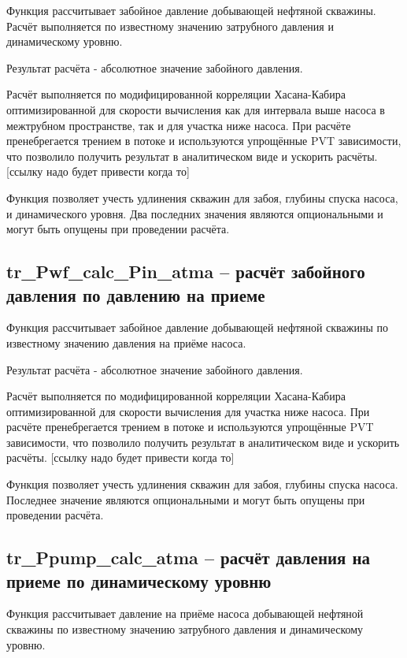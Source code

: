 \documentclass[]{scrreprt}
\begin{document}
Функция рассчитывает забойное давление добывающей нефтяной скважины. Расчёт выполняется по известному значению затрубного давления и динамическому уровню. \cite{Khasanov_TR_2006}

Результат расчёта - абсолютное значение забойного давления. 

Расчёт выполняется по модифицированной корреляции Хасана-Кабира оптимизированной для скорости вычисления как для интервала выше насоса в межтрубном пространстве, так и для участка ниже насоса. При расчёте пренебрегается трением в потоке и используются упрощённые PVT зависимости, что позволило получить результат в аналитическом виде и ускорить расчёты. [ссылку надо будет привести когда то] 

Функция позволяет учесть удлинения скважин для забоя, глубины спуска насоса, и динамического уровня. Два последних значения являются опциональными и могут быть опущены при проведении расчёта. 




\subsection{tr\_Pwf\_calc\_Pin\_atma – расчёт забойного давления по давлению на приеме}
Функция рассчитывает забойное давление добывающей нефтяной скважины по известному значению давления на приёме насоса. 

Результат расчёта - абсолютное значение забойного давления. 

Расчёт выполняется по модифицированной корреляции Хасана-Кабира оптимизированной для скорости вычисления для участка ниже насоса. При расчёте пренебрегается трением в потоке и используются упрощённые PVT зависимости, что позволило получить результат в аналитическом виде и ускорить расчёты. [ссылку надо будет привести когда то] 

Функция позволяет учесть удлинения скважин для забоя, глубины спуска насоса. Последнее значение являются опциональными и могут быть опущены при проведении расчёта. 


\subsection{tr\_Ppump\_calc\_atma – расчёт давления на приеме по динамическому уровню}
Функция рассчитывает давление на приёме насоса добывающей нефтяной скважины по известному значению затрубного давления и динамическому уровню. 
\end{document}
